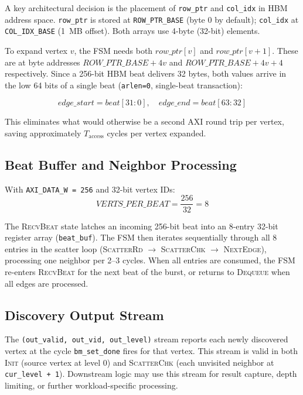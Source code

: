 A key architectural decision is the placement of \texttt{row\_ptr} and \texttt{col\_idx}
in HBM address space. \texttt{row\_ptr} is stored at \texttt{ROW\_PTR\_BASE}
(byte 0 by default); \texttt{col\_idx} at \texttt{COL\_IDX\_BASE} (1~MB offset).
Both arrays use 4-byte (32-bit) elements.

To expand vertex $v$, the FSM needs both $\mathit{row\_ptr}[v]$ and
$\mathit{row\_ptr}[v+1]$. These are at byte addresses
$\mathit{ROW\_PTR\_BASE} + 4v$ and $\mathit{ROW\_PTR\_BASE} + 4v + 4$ respectively.
Since a 256-bit HBM beat delivers 32 bytes, both values arrive in the low 64 bits of
a single beat (\texttt{arlen=0}, single-beat transaction):

\begin{equation}
\mathit{edge\_start} = \mathit{beat}[31:0], \quad
\mathit{edge\_end}   = \mathit{beat}[63:32]
\label{eq:ptr_unpack}
\end{equation}

This eliminates what would otherwise be a second AXI round trip per vertex,
saving approximately $T_\text{access}$ cycles per vertex expanded.

\subsection{Beat Buffer and Neighbor Processing}

With \texttt{AXI\_DATA\_W = 256} and 32-bit vertex IDs:
\begin{equation}
\mathit{VERTS\_PER\_BEAT} = \frac{256}{32} = 8
\end{equation}

The \textsc{RecvBeat} state latches an incoming 256-bit beat into an 8-entry
32-bit register array (\texttt{beat\_buf}). The FSM then iterates sequentially
through all 8 entries in the scatter loop (\textsc{ScatterRd} $\to$
\textsc{ScatterChk} $\to$ \textsc{NextEdge}), processing one neighbor per 2--3
cycles. When all entries are consumed, the FSM re-enters \textsc{RecvBeat} for the
next beat of the burst, or returns to \textsc{Dequeue} when all edges are processed.

\subsection{Discovery Output Stream}

The \texttt{(out\_valid, out\_vid, out\_level)} stream reports each newly discovered
vertex at the cycle \texttt{bm\_set\_done} fires for that vertex. This stream is
valid in both \textsc{Init} (source vertex at level 0) and \textsc{ScatterChk}
(each unvisited neighbor at \texttt{cur\_level + 1}). Downstream logic may use this
stream for result capture, depth limiting, or further workload-specific processing.
